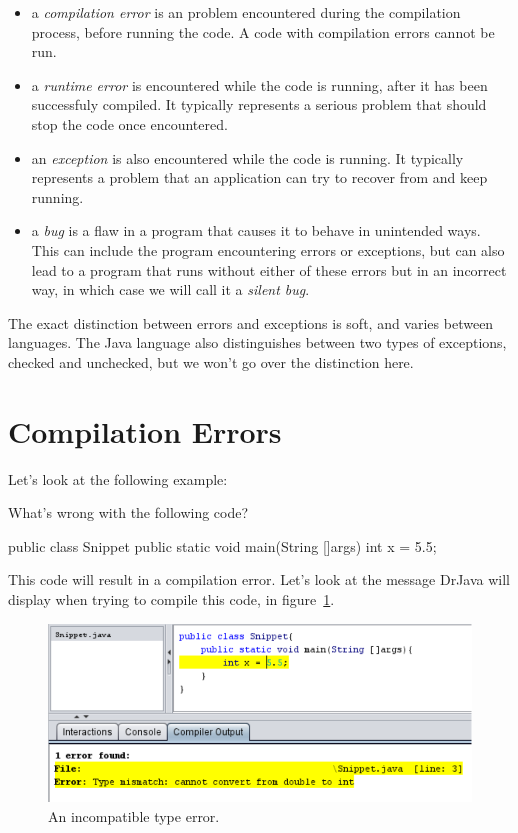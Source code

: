 \begin{definition}
\leavevmode\newline
\begin{itemize}
    \item a \emph{compilation error} is an problem encountered during the compilation process, before running the code. A code with compilation errors cannot be run.
    \item a \emph{runtime error} is encountered while the code is running, after it has been successfuly compiled. It typically represents a serious problem that should stop the code once encountered.
    \item an \emph{exception} is also encountered while the code is running. It typically represents a problem that an application can try to recover from and keep running.
    \item a \emph{bug} is a flaw in a program that causes it to behave in unintended ways. This can include the program encountering errors or exceptions, but can also lead to a program that runs without either of these errors but in an incorrect way, in which case we will call it a \emph{silent bug}.
\end{itemize}
\end{definition}

The exact distinction between errors and exceptions is soft, and varies between languages. The Java language also distinguishes between two types of exceptions, checked and unchecked, but we won't go over the distinction here.

\section{Compilation Errors}

Let's look at the following example:

\begin{example}
What's wrong with the following code?

\begin{code}
public class Snippet{
    public static void main(String []args){
        int x = 5.5;
    }
}
\end{code}
\end{example}

This code will result in a compilation error. Let's look at the message DrJava will display when trying to compile this code, in figure~\ref{fig:type_mismatch}.

\begin{figure}[h!]
\centering
\includegraphics[scale=0.8]{images/incompatible_types.PNG}
\caption{An incompatible type error.}
\label{fig:type_mismatch}
\end{figure}

